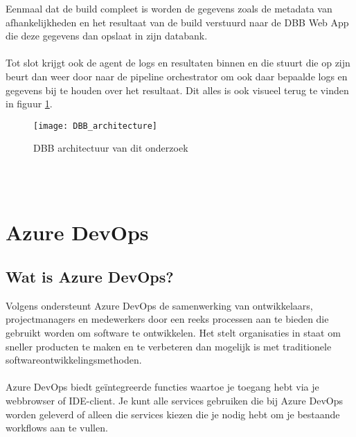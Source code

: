 Eenmaal dat de build compleet is worden de gegevens zoals de metadata van afhankelijkheden en het resultaat van de build verstuurd naar de DBB Web App die deze gegevens dan opslaat in zijn databank.
\\ \\
Tot slot krijgt ook de agent de logs en resultaten binnen en die stuurt die op zijn beurt dan weer door naar de pipeline orchestrator om ook daar bepaalde logs en gegevens bij te houden over het resultaat. Dit alles is ook visueel terug te vinden in figuur \ref{fig:dbb architectuur}.
\begin{figure}[h]
    \centering
    \texttt{[image: DBB\_architecture]}
    \caption{DBB architectuur van dit onderzoek}
    \label{fig:dbb architectuur}
\end{figure}
\\ \\
\section{Azure DevOps}
\label{sec:azure devops}
\subsection{Wat is Azure DevOps?}
Volgens \textcite{Microsoft2024} ondersteunt Azure DevOps de samenwerking van ontwikkelaars, projectmanagers en medewerkers door een reeks processen aan te bieden die gebruikt worden om software te ontwikkelen. Het stelt organisaties in staat om sneller producten te maken en te verbeteren dan mogelijk is met traditionele softwareontwikkelingsmethoden.
\\ \\
Azure DevOps biedt geïntegreerde functies waartoe je toegang hebt via je webbrowser of IDE-client. Je kunt alle services gebruiken die bij Azure DevOps worden geleverd of alleen die services kiezen die je nodig hebt om je bestaande workflows aan te vullen.
\\ \\
